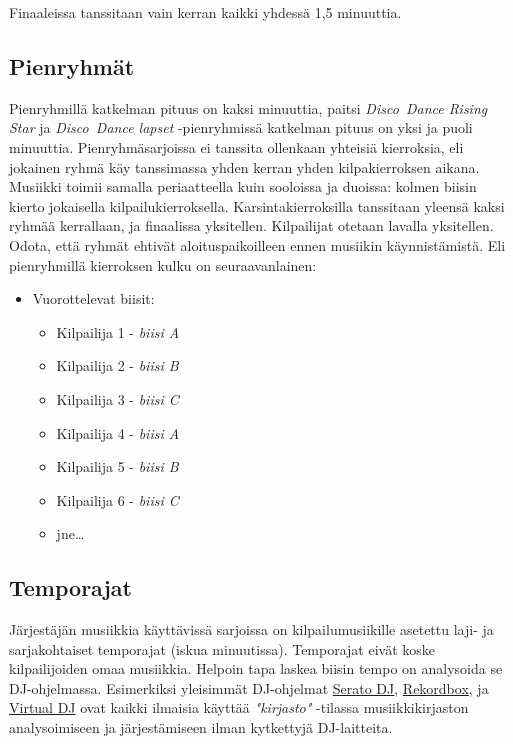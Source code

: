 \documentclass[12pt, a4paper, oneside]{article}
\begin{document}
Finaaleissa tanssitaan vain kerran kaikki yhdessä 1,5 minuuttia.

\subsection{Pienryhmät} \label{subsec:pienryhmat}

Pienryhmillä katkelman pituus on kaksi minuuttia,
paitsi \textit{Disco~Dance Rising Star} ja \textit{Disco~Dance lapset} -pienryhmissä katkelman pituus on yksi ja puoli minuuttia.
Pienryhmäsarjoissa ei tanssita ollenkaan yhteisiä kierroksia,
eli jokainen ryhmä käy tanssimassa yhden kerran yhden kilpakierroksen aikana.
Musiikki toimii samalla periaatteella kuin sooloissa ja duoissa: kolmen biisin kierto jokaisella kilpailukierroksella.
Karsintakierroksilla tanssitaan yleensä kaksi ryhmää kerrallaan,
ja finaalissa yksitellen.
Kilpailijat otetaan lavalla yksitellen.
Odota, että ryhmät ehtivät aloituspaikoilleen ennen musiikin käynnistämistä.
Eli pienryhmillä kierroksen kulku on seuraavanlainen:

\begin{itemize}[nosep]
    \item Vuorottelevat biisit:
          \begin{itemize}
              \item Kilpailija 1 - \textit{biisi A}
              \item Kilpailija 2 - \textit{biisi B}
              \item Kilpailija 3 - \textit{biisi C}
              \item Kilpailija 4 - \textit{biisi A}
              \item Kilpailija 5 - \textit{biisi B}
              \item Kilpailija 6 - \textit{biisi C}
              \item jne\ldots
          \end{itemize}
\end{itemize}

\subsection{Temporajat} \label{subsec:temporajat}

Järjestäjän musiikkia käyttävissä sarjoissa on kilpailumusiikille asetettu laji- ja sarjakohtaiset temporajat (iskua minuutissa).
Temporajat eivät koske kilpailijoiden omaa musiikkia.
Helpoin tapa laskea biisin tempo on analysoida se DJ-ohjelmassa.
Esimerkiksi yleisimmät DJ-ohjelmat \href{https://serato.com/dj}{Serato DJ},
\href{https://rekordbox.com/}{Rekordbox},
ja \href{https://www.virtualdj.com/}{Virtual DJ}
ovat kaikki ilmaisia käyttää \textit{"kirjasto"} -tilassa musiikkikirjaston analysoimiseen ja järjestämiseen ilman kytkettyjä DJ-laitteita.
\end{document}
